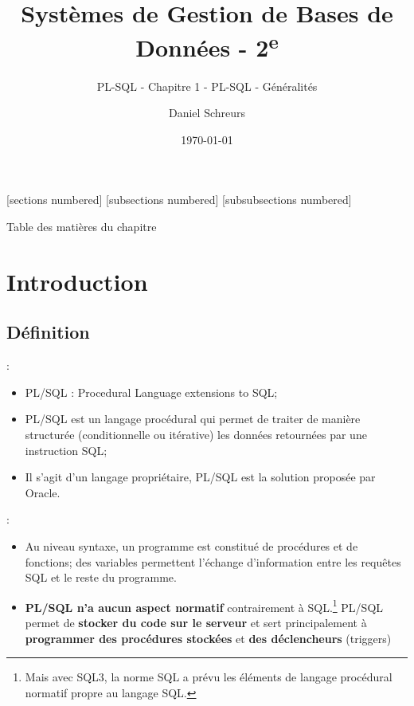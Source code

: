 \documentclass[10pt]{beamer}
\title{Systèmes de Gestion de Bases de Données - 2\textsuperscript{e}}
\subtitle{PL-SQL - Chapitre 1 - PL-SQL - Généralités}
\date{\today}
\author{Daniel Schreurs}
\institute{Haute École de Province de Liège}
\begin{document}
\maketitle

[sections numbered]
[subsections numbered]
[subsubsections numbered]
\begin{frame}[allowframebreaks]{Table des matières du chapitre}
    \tableofcontents[subsectionstyle=show/show/hide,subsubsectionstyle=show/show/hide,]
\end{frame}

\section{Introduction}
\tocss
\subsection{Définition}
\begin{frame}{\secname : \subsecname}
    \begin{itemize}
        \item PL/SQL : Procedural Language extensions to SQL;
        \item PL/SQL est un langage procédural qui permet de traiter de manière structurée (conditionnelle ou itérative) les données retournées par une instruction SQL;
        \item Il s'agit d'un langage propriétaire, PL/SQL est la solution proposée par Oracle.
    \end{itemize}
\end{frame}

\begin{frame}{\secname : \subsecname}
    \begin{itemize}
        \item Au niveau syntaxe, un programme est constitué de procédures et de fonctions; des variables permettent l'échange d'information entre les requêtes SQL et le reste du programme.
        \item \textbf{PL/SQL n'a aucun aspect normatif} contrairement à SQL.\footnote{Mais avec SQL3, la norme SQL a prévu les éléments de langage procédural normatif propre au langage SQL.}
              PL/SQL permet de \textbf{stocker du code sur le serveur} et sert principalement à \textbf{programmer des procédures stockées} et \textbf{des déclencheurs} (triggers)
    \end{itemize}
\end{frame}
\end{document}
